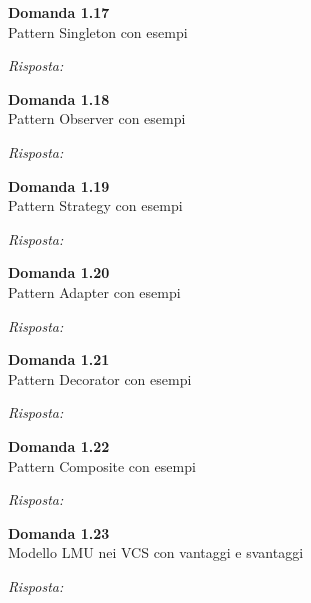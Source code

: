 \documentclass{article}
\newenvironment{problem}[2][Domanda]
    { \begin{mdframed}[backgroundcolor=gray!20] \textbf{#1 #2} \\}
    {  \end{mdframed}}
\newenvironment{solution}
    {\textit{Risposta:}}
    {}
\begin{document}
\begin{problem}{1.17}
Pattern Singleton con esempi
\end{problem}
\begin{solution}
\end{solution}


\begin{problem}{1.18}
Pattern Observer con esempi
\end{problem}
\begin{solution}
\end{solution}


\begin{problem}{1.19}
Pattern Strategy con esempi
\end{problem}
\begin{solution}
\end{solution}


\begin{problem}{1.20}
Pattern Adapter con esempi
\end{problem}
\begin{solution}
\end{solution}

\begin{problem}{1.21}
Pattern Decorator con esempi
\end{problem}
\begin{solution}
\end{solution}

\begin{problem}{1.22}
Pattern Composite con esempi
\end{problem}
\begin{solution}
\end{solution}

\begin{problem}{1.23}
Modello LMU nei VCS con vantaggi e svantaggi
\end{problem}
\begin{solution}
\end{solution}
\newpage
\end{document}
